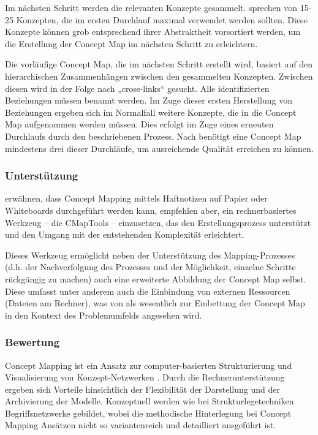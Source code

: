 Im nächsten Schritt werden die relevanten Konzepte gesammelt. \citet{Novak06} sprechen von 15-25 Konzepten, die im ersten Durchlauf maximal verwendet werden sollten. Diese Konzepte können grob entsprechend ihrer Abstraktheit vorsortiert werden, um die Erstellung der Concept Map im nächsten Schritt zu erleichtern.

Die vorläufige Concept Map, die im nächsten Schritt erstellt wird, basiert auf den hierarchischen Zusammenhängen zwischen den gesammelten Konzepten. Zwischen diesen wird in der Folge nach „cross-links“ gesucht. Alle identifizierten Beziehungen müssen benannt werden. Im Zuge dieser ersten Herstellung von Beziehungen ergeben sich im Normalfall weitere Konzepte, die in die Concept Map aufgenommen werden müssen. Dies erfolgt im Zuge eines erneuten Durchlaufs durch den beschriebenen Prozess. Nach \citet{Novak06} benötigt eine Concept Map mindestens drei dieser Durchläufe, um ausreichende Qualität erreichen zu können.

\subsubsection{Unterstützung}

\citet{Novak06} erwähnen, dass Concept Mapping mittels Haftnotizen auf Papier oder Whiteboards durchgeführt werden kann, empfehlen aber, ein rechnerbasiertes Werkzeug -- die CMapTools \citep{Canas04} -- einzusetzen, das den Erstellungsprozess unterstützt und den Umgang mit der entstehenden Komplexität erleichtert.

Dieses Werkzeug ermöglicht neben der Unterstützung des Mapping-Prozesses (d.h. der Nachverfolgung des Prozesses und der Möglichkeit, einzelne Schritte rückgängig zu machen) auch eine erweiterte Abbildung der Concept Map selbst. Diese umfasst unter anderem auch die Einbindung von externen Ressourcen (Dateien am Rechner), was von \citet{Novak06} als wesentlich zur Einbettung der Concept Map in den Kontext des Problemumfelds angesehen wird.

\subsubsection{Bewertung}

Concept Mapping ist ein Ansatz zur computer-basierten Strukturierung und Visualisierung von Konzept-Netzwerken \citep{Novak06}. Durch die Rechnerunterstützung ergeben sich Vorteile hinsichtlich der Flexibilität der Darstellung und der Archivierung der Modelle. Konzeptuell werden wie bei Strukturlegetechniken Begriffsnetzwerke gebildet, wobei die methodische Hinterlegung bei Concept Mapping Ansätzen nicht so variantenreich und detailliert ausgeführt ist. 

